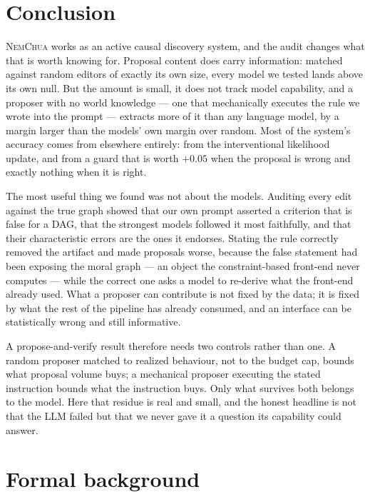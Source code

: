 \documentclass{article}
\newcommand{\nem}{\textsc{NemChua}}
\begin{document}
\section{Conclusion}
\label{sec:conclusion}

\nem{} works as an active causal discovery system, and the audit changes what that is worth knowing
for. Proposal content does carry information: matched against random editors of exactly its own
size, every model we tested lands above its own null. But the amount is small, it does not track
model capability, and a proposer with no world knowledge --- one that mechanically executes the rule
we wrote into the prompt --- extracts more of it than any language model, by a margin larger than
the models' own margin over random. Most of the system's accuracy comes from elsewhere entirely:
from the interventional likelihood update, and from a guard that is worth $+0.05$ when the proposal
is wrong and exactly nothing when it is right.

The most useful thing we found was not about the models. Auditing every edit against the true graph
showed that our own prompt asserted a criterion that is false for a DAG, that the strongest models
followed it most faithfully, and that their characteristic errors are the ones it endorses. Stating
the rule correctly removed the artifact and made proposals worse, because the false statement had
been exposing the moral graph --- an object the constraint-based front-end never computes --- while
the correct one asks a model to re-derive what the front-end already used. What a proposer can
contribute is not fixed by the data; it is fixed by what the rest of the pipeline has already
consumed, and an interface can be statistically wrong and still informative.

A propose-and-verify result therefore needs two controls rather than one. A random proposer matched
to realized behaviour, not to the budget cap, bounds what proposal volume buys; a mechanical
proposer executing the stated instruction bounds what the instruction buys. Only what survives both
belongs to the model. Here that residue is real and small, and the honest headline is not that the
LLM failed but that we never gave it a question its capability could answer.

\appendix

\section{Formal background}
\label{app:background}
\end{document}
